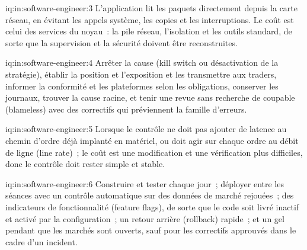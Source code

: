 \begin{solution}{iq:in:software-engineer:3}
L'application lit les paquets directement depuis la carte réseau, en évitant les appels système, les copies et les interruptions. Le coût est
celui des services du noyau~: la pile réseau, l'isolation et les outils standard, de sorte que la supervision et la sécurité doivent être reconstruites.
\end{solution}

\begin{solution}{iq:in:software-engineer:4}
Arrêter la cause (kill switch ou désactivation de la stratégie), établir la position et l'exposition et les transmettre aux traders,
informer la conformité et les plateformes selon les obligations, conserver les journaux, trouver la cause racine, et tenir une revue sans recherche de coupable (blameless) avec
des correctifs qui préviennent la famille d'erreurs.
\end{solution}

\begin{solution}{iq:in:software-engineer:5}
Lorsque le contrôle ne doit pas ajouter de latence au chemin d'ordre déjà implanté en matériel, ou doit agir sur chaque ordre au débit de ligne (line rate)~; le
coût est une modification et une vérification plus difficiles, donc le contrôle doit rester simple et stable.
\end{solution}

\begin{solution}{iq:in:software-engineer:6}
Construire et tester chaque jour~; déployer entre les séances avec un contrôle automatique sur des données de marché rejouées~; des indicateurs de fonctionnalité (feature flags), de sorte que
le code soit livré inactif et activé par la configuration~; un retour arrière (rollback) rapide~; et un gel pendant que les marchés sont ouverts, sauf pour
les correctifs approuvés dans le cadre d'un incident.
\end{solution}
